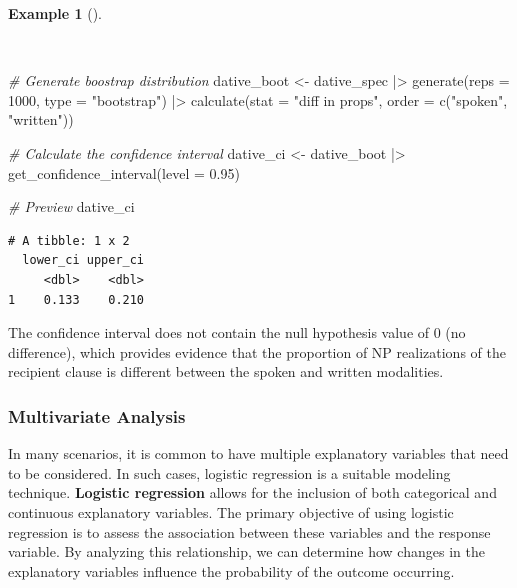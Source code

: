 \documentclass[
  letterpaper,
]{latex/krantz}
\newenvironment{Shaded}{\begin{snugshade}}{\end{snugshade}}
\newcommand{\AttributeTok}[1]{\textcolor[rgb]{0.00,0.00,0.00}{#1}}
\newcommand{\CommentTok}[1]{\textcolor[rgb]{0.00,0.00,0.00}{\textit{#1}}}
\newcommand{\DecValTok}[1]{\textcolor[rgb]{0.00,0.00,0.00}{#1}}
\newcommand{\FloatTok}[1]{\textcolor[rgb]{0.00,0.00,0.00}{#1}}
\newcommand{\FunctionTok}[1]{\textcolor[rgb]{0.00,0.00,0.00}{#1}}
\newcommand{\NormalTok}[1]{\textcolor[rgb]{0.00,0.00,0.00}{#1}}
\newcommand{\OtherTok}[1]{\textcolor[rgb]{0.00,0.00,0.00}{#1}}
\newcommand{\SpecialCharTok}[1]{\textcolor[rgb]{0.00,0.00,0.00}{#1}}
\newcommand{\StringTok}[1]{\textcolor[rgb]{0.00,0.00,0.00}{#1}}
\theoremstyle{definition}
\newtheorem{example}{Example}[chapter]
\theoremstyle{remark}
\begin{document}
\begin{example}[]\protect\hypertarget{exm-infer-cat-confidence-interval-bivariate}{}\label{exm-infer-cat-confidence-interval-bivariate}

~

\begin{Shaded}
\begin{Highlighting}[]
\CommentTok{\# Generate boostrap distribution}
\NormalTok{dative\_boot }\OtherTok{\textless{}{-}}
\NormalTok{  dative\_spec }\SpecialCharTok{|\textgreater{}}
  \FunctionTok{generate}\NormalTok{(}\AttributeTok{reps =} \DecValTok{1000}\NormalTok{, }\AttributeTok{type =} \StringTok{"bootstrap"}\NormalTok{) }\SpecialCharTok{|\textgreater{}}
  \FunctionTok{calculate}\NormalTok{(}\AttributeTok{stat =} \StringTok{"diff in props"}\NormalTok{, }\AttributeTok{order =} \FunctionTok{c}\NormalTok{(}\StringTok{"spoken"}\NormalTok{, }\StringTok{"written"}\NormalTok{))}

\CommentTok{\# Calculate the confidence interval}
\NormalTok{dative\_ci }\OtherTok{\textless{}{-}}
\NormalTok{  dative\_boot }\SpecialCharTok{|\textgreater{}}
  \FunctionTok{get\_confidence\_interval}\NormalTok{(}\AttributeTok{level =} \FloatTok{0.95}\NormalTok{)}

\CommentTok{\# Preview}
\NormalTok{dative\_ci}
\end{Highlighting}
\end{Shaded}

\begin{verbatim}
# A tibble: 1 x 2
  lower_ci upper_ci
     <dbl>    <dbl>
1    0.133    0.210
\end{verbatim}

\end{example}

The confidence interval does not contain the null hypothesis value of 0
(no difference), which provides evidence that the proportion of NP
realizations of the recipient clause is different between the spoken and
written modalities.

\subsubsection{Multivariate Analysis}\label{multivariate-analysis}

In many scenarios, it is common to have multiple explanatory variables
that need to be considered. In such cases, logistic regression is a
suitable modeling technique. \textbf{Logistic regression} allows for the
inclusion of both categorical and continuous explanatory variables. The
primary objective of using logistic regression is to assess the
association between these variables and the response variable. By
analyzing this relationship, we can determine how changes in the
explanatory variables influence the probability of the outcome
occurring.
\end{document}
